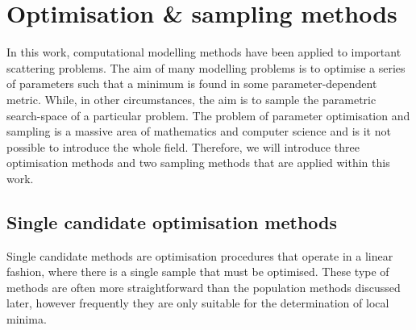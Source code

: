 \section{Optimisation \& sampling methods}
\label{sec:optimisation}
In this work, computational modelling methods have been applied to important scattering problems.
The aim of many modelling problems is to optimise a series of parameters such that a minimum is found in some parameter-dependent metric.
While, in other circumstances, the aim is to sample the parametric search-space of a particular problem.
The problem of parameter optimisation and sampling is a massive area of mathematics and computer science and is it not possible to introduce the whole field.
Therefore, we will introduce three optimisation methods and two sampling methods that are applied within this work.

\subsection{Single candidate optimisation methods}
\label{sec:singlecan}
Single candidate methods are optimisation procedures that operate in a linear fashion, where there is a single sample that must be optimised.
These type of methods are often more straightforward than the population methods discussed later, however frequently they are only suitable for the determination of local minima.

